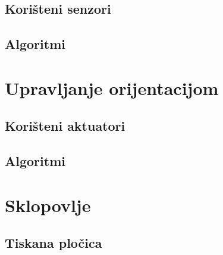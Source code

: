 \documentclass[times, utf8, diplomski, numeric]{templates/template}
\begin{document}
{{        \subsection{Korišteni senzori}{
        }

        \subsection{Algoritmi}{
        }
    }

    \section{Upravljanje orijentacijom}{
        \subsection{Korišteni aktuatori}{
        }

        \subsection{Algoritmi}{
        }
    }

    \section{Sklopovlje}{
        \subsection{Tiskana pločica}{
        }

}}
\end{document}

